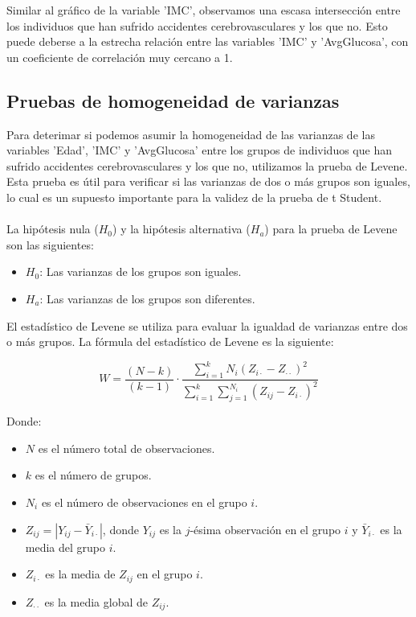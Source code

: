 \documentclass[a4paper, 12pt]{article}
\begin{document}
Similar al gráfico de la variable 'IMC', observamos una escasa intersección entre los individuos que han sufrido accidentes cerebrovasculares y los que no. Esto puede deberse a la estrecha relación entre las variables 'IMC' y 'AvgGlucosa', con un coeficiente de correlación muy cercano a 1.



\subsection{Pruebas de homogeneidad de varianzas}
Para deterimar si podemos asumir la homogeneidad de las varianzas de las variables 'Edad', 'IMC' y 'AvgGlucosa' entre los grupos de individuos que han sufrido accidentes cerebrovasculares y los que no, utilizamos la prueba de Levene. Esta prueba es útil para verificar si las varianzas de dos o más grupos son iguales, lo cual es un supuesto importante para la validez de la prueba de t Student.
\\ \\
La hipótesis nula (\(H_0\)) y la hipótesis alternativa (\(H_a\)) para la prueba de Levene son las siguientes:
\begin{itemize}
    \item \(H_0\): Las varianzas de los grupos son iguales.
    \item \(H_a\): Las varianzas de los grupos son diferentes.
\end{itemize}

El estadístico de Levene se utiliza para evaluar la igualdad de varianzas entre dos o más grupos. La fórmula del estadístico de Levene es la siguiente:

\[ W = \frac{(N - k)}{(k - 1)} \cdot \frac{\sum_{i=1}^{k} N_i (Z_{i\cdot} - Z_{\cdot\cdot})^2}{\sum_{i=1}^{k} \sum_{j=1}^{N_i} (Z_{ij} - Z_{i\cdot})^2} \]

Donde:
\begin{itemize}
    \item \( N \) es el número total de observaciones.
    \item \( k \) es el número de grupos.
    \item \( N_i \) es el número de observaciones en el grupo \( i \).
    \item \( Z_{ij} = |Y_{ij} - \bar{Y}_{i\cdot}| \), donde \( Y_{ij} \) es la \( j \)-ésima observación en el grupo \( i \) y \( \bar{Y}_{i\cdot} \) es la media del grupo \( i \).
    \item \( Z_{i\cdot} \) es la media de \( Z_{ij} \) en el grupo \( i \).
    \item \( Z_{\cdot\cdot} \) es la media global de \( Z_{ij} \).
\end{itemize}
\end{document}
